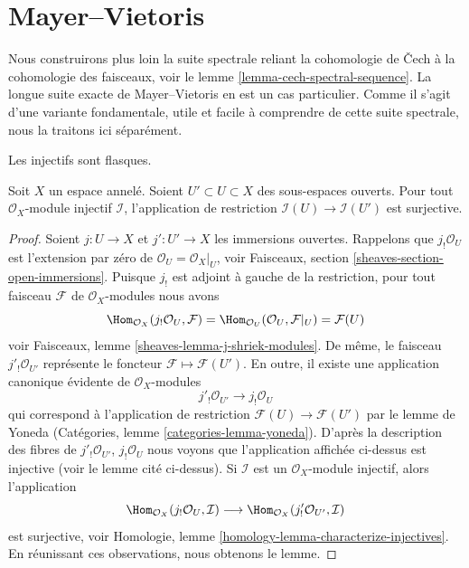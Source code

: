\section{Mayer--Vietoris}

\label{section-mayer-vietoris}

\noindent
Nous construirons plus loin la suite spectrale reliant la cohomologie de {\v C}ech à la cohomologie des faisceaux, voir le lemme \ref{lemma-cech-spectral-sequence}. La longue suite exacte de Mayer--Vietoris en est un cas particulier. Comme il s'agit d'une variante fondamentale, utile et facile à comprendre de cette suite spectrale, nous la traitons ici séparément.

\begin{lemma}

\label{lemma-injective-restriction-surjective}

\begin{slogan}
Les injectifs sont flasques.
\end{slogan}
Soit $X$ un espace annelé. Soient $U' \subset U \subset X$ des sous-espaces ouverts. Pour tout $\mathcal{O}_X$-module injectif $\mathcal{I}$, l'application de restriction $\mathcal{I}(U) \to \mathcal{I}(U')$ est surjective.
\end{lemma}

\begin{proof}

Soient $j : U \to X$ et $j' : U' \to X$ les immersions ouvertes. Rappelons que $j_!\mathcal{O}_U$ est l'extension par zéro de
$\mathcal{O}_U = \mathcal{O}_X|_U$, voir Faisceaux, section \ref{sheaves-section-open-immersions}. Puisque $j_!$ est adjoint à gauche de la restriction, pour tout faisceau $\mathcal{F}$ de $\mathcal{O}_X$-modules nous avons
$$
\Hom_{\mathcal{O}_X}(j_!\mathcal{O}_U, \mathcal{F})
=
\Hom_{\mathcal{O}_U}(\mathcal{O}_U, \mathcal{F}|_U)
=
\mathcal{F}(U)
$$
voir Faisceaux, lemme \ref{sheaves-lemma-j-shriek-modules}. De même, le faisceau $j'_!\mathcal{O}_{U'}$ représente le foncteur $\mathcal{F} \mapsto \mathcal{F}(U')$. En outre, il existe une application canonique évidente de $\mathcal{O}_X$-modules
$$
j'_!\mathcal{O}_{U'} \longrightarrow j_!\mathcal{O}_U
$$
qui correspond à l'application de restriction
$\mathcal{F}(U) \to \mathcal{F}(U')$ par le lemme de Yoneda (Catégories, lemme \ref{categories-lemma-yoneda}). D'après la description des fibres de
$j'_!\mathcal{O}_{U'}$, $j_!\mathcal{O}_U$
nous voyons que l'application affichée ci-dessus est injective (voir le lemme cité ci-dessus). Si $\mathcal{I}$ est un $\mathcal{O}_X$-module injectif, alors l'application
$$
\Hom_{\mathcal{O}_X}(j_!\mathcal{O}_U, \mathcal{I})
\longrightarrow
\Hom_{\mathcal{O}_X}(j'_!\mathcal{O}_{U'}, \mathcal{I})
$$
est surjective, voir Homologie, lemme \ref{homology-lemma-characterize-injectives}. En réunissant ces observations, nous obtenons le lemme.

\end{proof}

